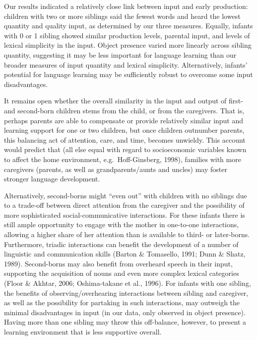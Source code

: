 \documentclass[man,floatsintext]{apa6}
\begin{document}
Our results indicated a relatively close link between input and early production: children with two or more siblings said the fewest words and heard the lowest quantity and quality input, as determined by our three measures. Equally, infants with 0 or 1 sibling showed similar production levels, parental input, and levels of lexical simplicity in the input. Object presence varied more linearly across sibling quantity, suggesting it may be less important for language learning than our broader measures of input quantity and lexical simplicity. Alternatively, infants' potential for language learning may be sufficiently robust to overcome some input disadvantages.

It remains open whether the overall similarity in the input and output of first- and second-born children stems from the child, or from the caregivers. That is, perhaps parents are able to compensate or provide relatively similar input and learning support for one or two children, but once children outnumber parents, this balancing act of attention, care, and time, becomes unwieldy. This account would predict that (all else equal with regard to socioeconomic variables known to affect the home environment, e.g.~Hoff-Ginsberg, 1998), families with more caregivers (parents, as well as grandparents/aunts and uncles) may foster stronger language development.

Alternatively, second-borns might \enquote{even out} with children with no siblings due to a trade-off between direct attention from the caregiver and the possibility of more sophisticated social-communicative interactions. For these infants there is still ample opportunity to engage with the mother in one-to-one interactions, allowing a higher share of her attention than is available to third- or later-borns. Furthermore, triadic interactions can benefit the development of a number of linguistic and communication skills (Barton \& Tomasello, 1991; Dunn \& Shatz, 1989). Second-borns may also benefit from overheard speech in their input, supporting the acquisition of nouns and even more complex lexical categories (Floor \& Akhtar, 2006; Oshima-takane et al., 1996). For infants with one sibling, the benefits of observing/overhearing interactions between sibling and caregiver, as well as the possibility for partaking in such interactions, may outweigh the minimal disadvantages in input (in our data, only observed in object presence). Having more than one sibling may throw this off-balance, however, to present a learning environment that is less supportive overall.
\end{document}
